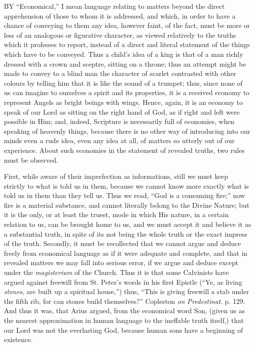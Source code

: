 BY
``Economical,'' I mean language relating to matters beyond the direct
apprehension of those to whom it is addressed, and which, in order to
have a chance of conveying to them any idea, however faint, of the
fact, must be more or less of an analogous or figurative character, as
viewed relatively to the truths which it professes to report, instead
of a direct and literal statement of the things which have to be
conveyed. Thus a child's idea of a king is that of a man richly
dressed with a crown and sceptre, sitting on a throne; thus an attempt
might be made to convey to a blind man the character of scarlet
contrasted with other colours by telling him that it is like the sound
of a trumpet; thus, since none of us can imagine to ourselves a spirit
and its properties, it is a received economy to represent Angels as
bright beings with wings. Hence, again, it is an economy to speak of
our Lord as sitting on the right hand of God, as if right and left
were possible in Him; and, indeed, Scripture is necessarily full of
economies, when speaking of heavenly things, because there is no other
way of introducing into our minds even a rude idea, even any idea at
all, of matters so utterly out of our experience. About such economies
in the statement of revealed truths, two rules must be observed.

First, while aware of their imperfection as
informations, still we must keep strictly to what is told us in them,
because we cannot know more exactly what is told us in them than they
tell us. Thus we read, ``God is a consuming fire;'' now fire is a
material substance, and cannot literally belong to the Divine Nature;
but it is the only, or at least the truest, mode in which His nature,
in a certain relation to us, can be brought home to us, and we must
accept it and believe it as a substantial truth, in spite of its not
being the whole truth or the exact impress of the truth. Secondly, it
must be recollected that we cannot argue and deduce freely from
economical language as if it were adequate and complete, and that in
revealed matters we may fall into serious error, if we argue and
deduce except under the \emph{magisterium}
of the Church. Thus it is that some Calvinists have argued
against freewill from St. Peter's words in his first Epistle (``Ye, as
living \emph{stones}, are
built up a spiritual house,'') thus, ``This is giving freewill a stab
under the fifth rib, for can stones build themselves?'' Copleston \emph{on
Predestinat}. p.
129. And thus it was, that Arius argued, from the economical word Son,
(given us as the nearest approximation in human language to the
ineffable truth itself,) that our Lord was not the everlasting God,
because human sons have a beginning of existence.

